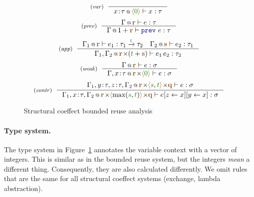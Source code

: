 \begin{figure}[t]
\begin{equation*}
\tyrule{var}{}
  {\coctx{x \!:\! \tau}{\alift{\cclrd{0}}} \vdash x : \tau} 
\end{equation*}
\begin{equation*}
\tyrule{prev}
  {\coctx{\Gamma}{\aclrd{\textbf{r}}} \vdash e : \tau}
  {\coctx{\Gamma}{1 + \aclrd{\textbf{r}}} \vdash \kvd{prev}~e : \tau}  
\end{equation*}
\begin{equation*}
\tyrule{app}
  { \coctx{\Gamma_1}{\aclrd{\textbf{r}}} \vdash e_1 : \tau_1 \xrightarrow{\cclrd{t}} \tau_2 \quad 
    \coctx{\Gamma_2}{\aclrd{\textbf{s}}} \vdash e_2 : \tau_1}
  { \coctx{\Gamma_1, \Gamma_2}{\aclrd{\textbf{r}} \cons (\cclrd{t} + \aclrd{\textbf{s}})} \vdash e_1 \, e_2 : \tau_2} 
\end{equation*}
\begin{equation*}
\tyrule{weak}
  {\coctx{\Gamma}{ \aclrd{\textbf{r}} } \vdash e : \sigma}
  {\coctx{\Gamma,x \!:\! \tau}{\aclrd{\textbf{r}} \cons \alift{ \cclrd{0} }} \vdash e : \sigma} 
\end{equation*}
\begin{equation*}
\tyrule{contr}
  {\coctx{\Gamma_1,y\!:\!\tau,z\!:\!\tau,\Gamma_2}{\aclrd{\textbf{r}} \cons \alift{\cclrd{s},\cclrd{t}} \cons \aclrd{\textbf{q}}} \vdash e : \sigma}
  {\coctx{\Gamma_1,x\!:\!\tau,\Gamma_2}{\aclrd{\textbf{r}} \cons \alift{\textnormal{max}(\cclrd{s},\cclrd{t})} \cons \aclrd{\textbf{q}}} \vdash \subst{\subst{e}{z}{x}}{y}{x} : \sigma}
\end{equation*}

\caption{Structural coeffect bounded reuse analysis}
\label{fig:applications-struct-df}
\vspace{-1em}
\end{figure}


\paragraph{Type system.} 
The type system in Figure~\ref{fig:applications-struct-df} annotates the variable context with a
vector of integers. This is similar as in the bounded reuse system, but the integers \emph{mean} a
different thing. Consequently, they are also calculated differently. We omit rules that are the
same for all structural coeffect systems (exchange, lambda abstraction).

